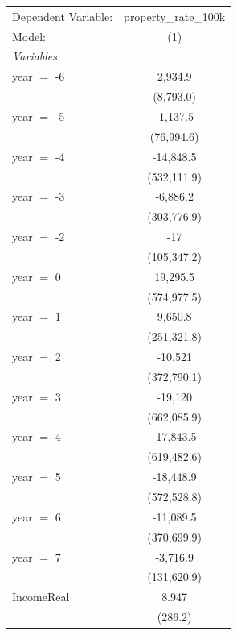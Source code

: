 
\begingroup
\centering
\begin{tabular}{lc}
   \tabularnewline \midrule \midrule
   Dependent Variable: & property\_rate\_100k\\    
   Model:              & (1)\\  
   \midrule
   \emph{Variables}\\
   year $=$ -6         & 2,934.9\\   
                       & (8,793.0)\\   
   year $=$ -5         & -1,137.5\\   
                       & (76,994.6)\\   
   year $=$ -4         & -14,848.5\\   
                       & (532,111.9)\\   
   year $=$ -3         & -6,886.2\\   
                       & (303,776.9)\\   
   year $=$ -2         & -17\\   
                       & (105,347.2)\\   
   year $=$ 0          & 19,295.5\\   
                       & (574,977.5)\\   
   year $=$ 1          & 9,650.8\\   
                       & (251,321.8)\\   
   year $=$ 2          & -10,521\\   
                       & (372,790.1)\\   
   year $=$ 3          & -19,120\\   
                       & (662,085.9)\\   
   year $=$ 4          & -17,843.5\\   
                       & (619,482.6)\\   
   year $=$ 5          & -18,448.9\\   
                       & (572,528.8)\\   
   year $=$ 6          & -11,089.5\\   
                       & (370,699.9)\\   
   year $=$ 7          & -3,716.9\\   
                       & (131,620.9)\\   
   IncomeReal          & 8.947\\   
                       & (286.2)\\   
   \midrule

\end{tabular}

